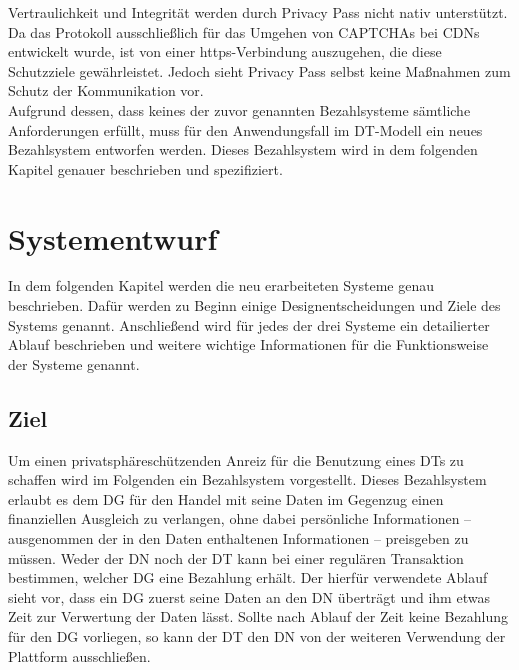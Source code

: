 \documentclass[
	fontsize=11pt,
	headings=small,
	parskip=half,           %
	bibliography=totoc,
	numbers=noenddot,       %
	open=any,               %
]{scrreprt}
\begin{document}
Vertraulichkeit und Integrität werden durch Privacy Pass nicht nativ unterstützt. Da das Protokoll ausschließlich für das Umgehen von CAPTCHAs bei CDNs entwickelt wurde, ist von einer https-Verbindung auszugehen, die diese Schutzziele gewährleistet. Jedoch sieht Privacy Pass selbst keine Maßnahmen zum Schutz der Kommunikation vor.\\

Aufgrund dessen, dass keines der zuvor genannten Bezahlsysteme sämtliche Anforderungen erfüllt, muss für den Anwendungsfall im DT-Modell ein neues Bezahlsystem entworfen werden. Dieses Bezahlsystem wird in dem folgenden Kapitel genauer beschrieben und spezifiziert. 






\chapter{Systementwurf}
\label{chap:systems}
In dem folgenden Kapitel werden die neu erarbeiteten Systeme genau beschrieben. Dafür werden zu Beginn einige Designentscheidungen und Ziele des Systems genannt. Anschließend wird für jedes der drei Systeme ein detailierter Ablauf beschrieben und weitere wichtige Informationen für die Funktionsweise der Systeme genannt.

\section{Ziel}
\label{sec:mainPart_ziel}
Um einen privatsphäreschützenden Anreiz für die Benutzung eines DTs zu schaffen wird im Folgenden ein Bezahlsystem vorgestellt. Dieses Bezahlsystem erlaubt es dem DG für den Handel mit seine Daten im Gegenzug einen finanziellen Ausgleich zu verlangen, ohne dabei persönliche Informationen -- ausgenommen der in den Daten enthaltenen Informationen -- preisgeben zu müssen. Weder der DN noch der DT kann bei einer regulären Transaktion bestimmen, welcher DG eine Bezahlung erhält. Der hierfür verwendete Ablauf sieht vor, dass ein DG zuerst seine Daten an den DN überträgt und ihm etwas Zeit zur Verwertung der Daten lässt. Sollte nach Ablauf der Zeit keine Bezahlung für den DG vorliegen, so kann der DT den DN von der weiteren Verwendung der Plattform ausschließen. 
\end{document}
